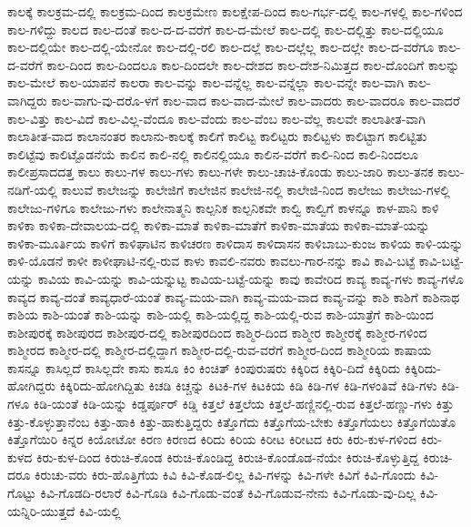 {ಕಾಲಕ್ಕೆ
ಕಾಲಕ್ರಮ-ದಲ್ಲಿ
ಕಾಲಕ್ರಮ-ದಿಂದ
ಕಾಲಕ್ರಮೇಣ
ಕಾಲಕ್ಷೇಪ-ದಿಂದ
ಕಾಲ-ಗರ್ಭ-ದಲ್ಲಿ
ಕಾಲ-ಗಳಲ್ಲಿ
ಕಾಲ-ಗಳಿಂದ
ಕಾಲ-ಗಳಿದ್ದು
ಕಾಲದ
ಕಾಲ-ದಂತೆ
ಕಾಲ-ದ-ದ-ವರೆಗೆ
ಕಾಲ-ದ-ಮೇಲೆ
ಕಾಲ-ದಲ್ಲಿ
ಕಾಲ-ದಲ್ಲಿತ್ತು
ಕಾಲ-ದಲ್ಲಿಯೂ
ಕಾಲ-ದಲ್ಲಿಯೇ
ಕಾಲ-ದಲ್ಲಿ-ಯೇನೋ
ಕಾಲ-ದಲ್ಲಿ-ರಲಿ
ಕಾಲ-ದಲ್ಲೆ
ಕಾಲ-ದಲ್ಲೆಲ್ಲ
ಕಾಲ-ದಲ್ಲೇ
ಕಾಲ-ದ-ವರೆಗೂ
ಕಾಲ-ದ-ವರೆಗೆ
ಕಾಲ-ದಿಂದ
ಕಾಲ-ದಿಂದಲೂ
ಕಾಲ-ದಿಂದಲೇ
ಕಾಲ-ದೇಶದ
ಕಾಲ-ದೇಶ-ನಿಮಿತ್ತದ
ಕಾಲ-ದೊಂದಿಗೆ
ಕಾಲನ್ನು
ಕಾಲ-ಮೇಲೆ
ಕಾಲ-ಯಾಪನೆ
ಕಾಲರಾ
ಕಾಲ-ವನ್ನು
ಕಾಲ-ವನ್ನೆಲ್ಲ
ಕಾಲ-ವನ್ನೆಲ್ಲಾ
ಕಾಲ-ವನ್ನೇ
ಕಾಲ-ವಾಗಿ
ಕಾಲ-ವಾಗಿದ್ದರು
ಕಾಲ-ವಾಗು-ವು-ದರೊ-ಳಗೆ
ಕಾಲ-ವಾದ
ಕಾಲ-ವಾದ-ಮೇಲೆ
ಕಾಲ-ವಾದರು
ಕಾಲ-ವಾದರೂ
ಕಾಲ-ವಾದರೆ
ಕಾಲ-ವಿತ್ತು
ಕಾಲ-ವಿದೆ
ಕಾಲ-ವಿಲ್ಲ-ವೆಂದೂ
ಕಾಲ-ವೆಂದು
ಕಾಲ-ವೆಂಬ
ಕಾಲ-ವೆಲ್ಲ
ಕಾಲವೇ
ಕಾಲಾತೀತ-ವಾಗಿ
ಕಾಲಾತೀತ-ವಾದ
ಕಾಲಾನಂತರ
ಕಾಲಾನು-ಕಾಲಕ್ಕೆ
ಕಾಲಿಗೆ
ಕಾಲಿಟ್ಟ
ಕಾಲಿಟ್ಟರು
ಕಾಲಿಟ್ಟಳು
ಕಾಲಿಟ್ಟಾಗ
ಕಾಲಿಟ್ಟಿತು
ಕಾಲಿಟ್ಟೆವು
ಕಾಲಿಟ್ಟೊಡನೆಯೆ
ಕಾಲಿನ
ಕಾಲಿ-ನಲ್ಲಿ
ಕಾಲಿನಲ್ಲಿಯೂ
ಕಾಲಿನ-ವರೆಗೆ
ಕಾಲಿ-ನಿಂದ
ಕಾಲಿ-ನಿಂದಲೂ
ಕಾಲೀಪ್ರಸಾದದತ್ತ
ಕಾಲು
ಕಾಲು-ಗಳ
ಕಾಲು-ಗಳು
ಕಾಲು-ಗಳೇ
ಕಾಲು-ಚಾಚಿ-ಕೊಂಡು
ಕಾಲು-ಜಾರಿ
ಕಾಲು-ತನಕ
ಕಾಲು-ನಡಿಗೆ-ಯಲ್ಲಿ
ಕಾಲುವೆ
ಕಾಲೇಜನ್ನು
ಕಾಲೇಜಿಗೆ
ಕಾಲೇಜಿನ
ಕಾಲೇಜಿ-ನಲ್ಲಿ
ಕಾಲೇಜಿ-ನಿಂದ
ಕಾಲೇಜು
ಕಾಲೇಜು-ಗಳಲ್ಲಿ
ಕಾಲೇಜು-ಗಳಿಗೂ
ಕಾಲೇಜು-ಗಳು
ಕಾಲೇನಾತ್ಮನಿ
ಕಾಲ್ಪನಿಕ
ಕಾಲ್ಪನಿಕವೇ
ಕಾಲ್ವಿ
ಕಾಲ್ವಿಗೆ
ಕಾಳನ್ನೂ
ಕಾಳ-ಪಾನಿ
ಕಾಳಿ
ಕಾಳಿಕಾ
ಕಾಳಿಕಾ-ದೇವಾಲಯ-ದಲ್ಲಿ
ಕಾಳಿಕಾ-ಮಾತೆ
ಕಾಳಿಕಾ-ಮಾತೆಗೆ
ಕಾಳಿಕಾ-ಮಾತೆಯ
ಕಾಳಿಕಾ-ಮಾತೆ-ಯನ್ನು
ಕಾಳಿಕಾ-ಮೂರ್ತಿಯ
ಕಾಳಿಗೆ
ಕಾಳಿಘಾಟಿನ
ಕಾಳಿಚರಣ
ಕಾಳಿದಾಸ
ಕಾಳಿದಾಸನ
ಕಾಳಿಬಾಬು-ಕುಂಜ
ಕಾಳಿಯ
ಕಾಳಿ-ಯನ್ನು
ಕಾಳಿ-ಯೊಡನೆ
ಕಾಳೀ
ಕಾಳೀಘಾಟಿ-ನಲ್ಲಿ-ರುವ
ಕಾಳು
ಕಾವಲಿ-ನವರು
ಕಾವಲು-ಗಾರ-ನನ್ನು
ಕಾವಿ
ಕಾವಿ-ಬಟ್ಟೆ
ಕಾವಿ-ಬಟ್ಟೆ-ಯನ್ನು
ಕಾವಿಯ
ಕಾವಿ-ಯನ್ನು
ಕಾವಿ-ಯನ್ನುಟ್ಟ
ಕಾವಿಯ-ಬಟ್ಟೆ-ಯನ್ನು
ಕಾವು
ಕಾವೇರಿದ
ಕಾವ್ಯ
ಕಾವ್ಯ-ಗಳು
ಕಾವ್ಯ-ಗಳೊ
ಕಾವ್ಯದ
ಕಾವ್ಯ-ದಂತೆ
ಕಾವ್ಯಧಾರೆ-ಯಂತೆ
ಕಾವ್ಯ-ಮಯ-ವಾಗಿ
ಕಾವ್ಯ-ಮಯ-ವಾದ
ಕಾವ್ಯ-ವನ್ನು
ಕಾಶಿ
ಕಾಶಿಗೆ
ಕಾಶಿನಾಥ
ಕಾಶಿಯ
ಕಾಶಿ-ಯಂತೆ
ಕಾಶಿ-ಯನ್ನು
ಕಾಶಿ-ಯಲ್ಲಿ
ಕಾಶಿ-ಯಲ್ಲಿದ್ದ
ಕಾಶಿ-ಯಲ್ಲಿ-ರುವ
ಕಾಶಿ-ಯಾತ್ರೆಗೆ
ಕಾಶಿ-ಯಿಂದ
ಕಾಶೀಪುರಕ್ಕೆ
ಕಾಶೀಪುರದ
ಕಾಶೀಪುರ-ದಲ್ಲಿ
ಕಾಶೀಪುರದಿಂದ
ಕಾಶ್ಮಿರ-ದಿಂದ
ಕಾಶ್ಮೀರ
ಕಾಶ್ಮೀರಕ್ಕೆ
ಕಾಶ್ಮೀರ-ಗಳಿಂದ
ಕಾಶ್ಮೀರದ
ಕಾಶ್ಮೀರ-ದಲ್ಲಿ
ಕಾಶ್ಮೀರ-ದಲ್ಲಿದ್ದಾಗ
ಕಾಶ್ಮೀರ-ದಲ್ಲಿ-ರುವ-ವರೆಗೆ
ಕಾಶ್ಮೀರ-ದಿಂದ
ಕಾಶ್ಮೀರಿಯ
ಕಾಷಾಯ
ಕಾಸನ್ನೂ
ಕಾಸಿಲ್ಲದೆ
ಕಾಸಿಲ್ಲದೇ
ಕಾಸು
ಕಾಸೂ
ಕಿಂ
ಕಿಂಚಿತ್
ಕಿಂಪುರುಷರು
ಕಿಕ್ಕಿರಿದ
ಕಿಕ್ಕಿರಿ-ದಿದೆ
ಕಿಕ್ಕಿರಿದು
ಕಿಕ್ಕಿರಿದು-ಹೋಗಿದ್ದರು
ಕಿಕ್ಕಿರಿದು-ಹೋಗಿದ್ದಿತು
ಕಿಚಡಿ
ಕಿಚ್ಚನ್ನು
ಕಿಟಕಿ-ಗಳ
ಕಿಟಕಿಯ
ಕಿಡಿ
ಕಿಡಿ-ಗಳ
ಕಿಡಿ-ಗಳಂತಿವೆ
ಕಿಡಿ-ಗಳು
ಕಿಡಿ-ಗಳೂ
ಕಿಡಿ-ಯಂತೆ
ಕಿಡಿ-ಯನ್ನು
ಕಿಡ್ಡರ್ಪೂರ್
ಕಿಡ್ಡಿ
ಕಿತ್ತಲೆ
ಕಿತ್ತಲೆಯ
ಕಿತ್ತಲೆ-ಹಣ್ಣಿನಲ್ಲಿ-ರುವ
ಕಿತ್ತಲೆ-ಹಣ್ಣು-ಗಳು
ಕಿತ್ತು
ಕಿತ್ತು-ಕೊಳ್ಳುತ್ತಾನೆಂಬ
ಕಿತ್ತು-ಹಾಕಿ
ಕಿತ್ತು-ಹಾಕುತ್ತಿದ್ದರು
ಕಿತ್ತೊಗೆದು
ಕಿತ್ತೊಗೆಯ-ಬೇಕು
ಕಿತ್ತೊಗೆಯಲು
ಕಿತ್ತೊಗೆಯಿತೊ
ಕಿತ್ತೊಗೆಯಿರಿ
ಕಿನ್ನರ
ಕಿಯೋಟೋ
ಕಿರಣ
ಕಿರಣದ
ಕಿರಿದು
ಕಿರಿಯ
ಕಿರೀಟ
ಕಿರೀಟದ
ಕಿರು
ಕಿರು-ಕುಳ-ಗಳಿಂದ
ಕಿರು-ಕುಳದ
ಕಿರು-ಕುಳ-ದಿಂದ
ಕಿರುಚಿ-ಕೊಂಡ
ಕಿರುಚಿ-ಕೊಂಡಿದ್ದ
ಕಿರುಚಿ-ಕೊಂಡೊಡ-ನೆಯೇ
ಕಿರುಚಿ-ಕೊಳ್ಳುತ್ತಿದ್ದ
ಕಿರುಚಿ-ದರೂ
ಕಿರುಚು-ವರು
ಕಿರು-ಹೊತ್ತಿಗೆಯ
ಕಿವಿ
ಕಿವಿ-ಕೊಡ-ಲಿಲ್ಲ
ಕಿವಿ-ಗಳನ್ನು
ಕಿವಿ-ಗಳೇ
ಕಿವಿಗೆ
ಕಿವಿ-ಗೊಂದು
ಕಿವಿ-ಗೊಟ್ಟು
ಕಿವಿ-ಗೊಡದಿ-ರಲಾರೆ
ಕಿವಿ-ಗೊಡಿ
ಕಿವಿ-ಗೊಡು-ವಂತೆ
ಕಿವಿ-ಗೊಡುವ-ನೇನು
ಕಿವಿ-ಗೊಡು-ವು-ದಿಲ್ಲ
ಕಿವಿ-ಯನ್ನಿರಿ-ಯುತ್ತದೆ
ಕಿವಿ-ಯಲ್ಲಿ
}
